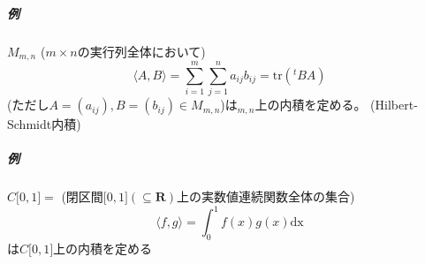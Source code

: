 \documentclass[12pt,a4paper]{article}
\begin{document}
    \subparagraph{例}
      $M_{m,n}$ ($m \times n$の実行列全体において) 
      \[ \langle A, B \rangle = \underset{i=1}{ \overset{m}{\sum}}\underset{j=1}{\overset{n}{\sum}} a_{ij} b_{ij} = \text{tr} ({}^t BA)\]
      (ただし$A= (a_{ij}), B = (b_{ij}) \in M_{m,n}$)は$_{m,n}$上の内積を定める。  (Hilbert-Schmidt内積)
    \subparagraph{例}
      $C\lbrack0,1\rbrack = $ (閉区間$\lbrack0,1\rbrack (\subseteq \mathbf{R})$上の実数値連続関数全体の集合) 
      \[\langle f, g \rangle = \int_0^1 f(x) g(x) \text{dx} \]
      は$C\lbrack0,1\rbrack$上の内積を定める
  
\end{document}
